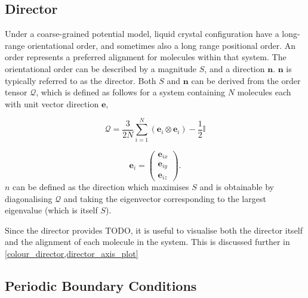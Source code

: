 \subsection{Director}
Under a coarse-grained potential model, liquid crystal configuration have a long-range orientational order, and sometimes also a long range positional order. An order represents a preferred alignment for molecules within that system\cite{dong1997orientational}. The orientational order can be described by a magnitude $S$, and a direction $\mathbf{n}$. $\mathbf{n}$ is typically referred to as the director. Both $S$ and $\mathbf{n}$ can be derived from the order tensor $\mathcal{Q}$, which is defined as follows for a system containing $N$ molecules each with unit vector direction $\mathbf{e}$,

\begin{equation}
\mathcal{Q}=
\frac{3}{2N}
\sum_{i=1}^{N}
(\mathbf{e}_i
\otimes
\mathbf{e}_i)
-\frac{1}{2}\mathbb{I}
\end{equation}

\begin{equation}
\mathbf{e}_i=\begin{pmatrix}
  \mathbf{e}_{ix}\\
  \mathbf{e}_{iy}\\
  \mathbf{e}_{iz}
\end{pmatrix}.
\label{order_tensor_e}
\end{equation}
$n$ can be defined as the direction which maximises $S$ and is obtainable by diagonalising $\mathcal{Q}$ and taking the eigenvector corresponding to the largest eigenvalue (which is itself $S$).

Since the director provides TODO, it is useful to visualise both the director itself and the alignment of each molecule in the system. This is discussed further in \cref{colour_director,director_axis_plot}

\subsection{Periodic Boundary Conditions}
